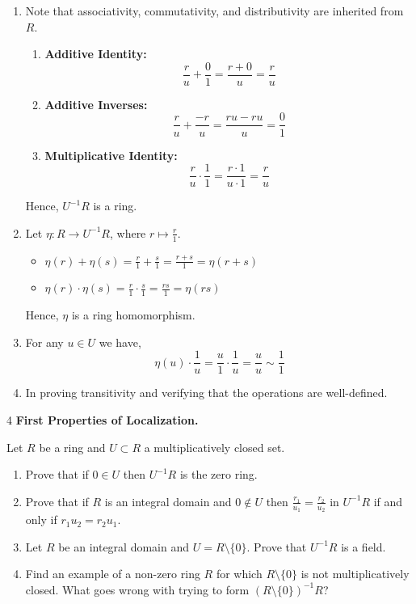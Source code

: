 \documentclass[Notebook.tex]{subfiles}
\begin{document}
\begin{solution}
\begin{enumerate}
\begin{enumerate}
		\end{enumerate}


		\item Note that associativity, commutativity, and distributivity  are inherited from $R$. 
		\begin{enumerate}
			\item \textbf{Additive Identity:} 
			\[\frac{r}{u} + \frac{0}{1} = \frac{r + 0}{u} = \frac{r}{u}\]
			\item \textbf{Additive Inverses:}
			\[\frac{r}{u} + \frac{-r}{u} = \frac{ru - ru}{u} = \frac{0}{1}\]
			\item \textbf{Multiplicative Identity:}
			\[\frac{r}{u} \cdot \frac{1}{1} = \frac{r \cdot 1}{u \cdot 1} = \frac{r}{u}\]
		\end{enumerate}
		Hence, $U^{-1}R$ is a ring. 

		\item Let $\eta: R \to U^{-1}R$, where $r \mapsto \frac{r}{1}$. 
		\begin{itemize}
			\item $\eta(r) + \eta(s) = \frac{r}{1} + \frac{s}{1} = \frac{r + s}{1} = \eta(r+s)$
			\item $\eta(r) \cdot \eta(s) = \frac{r}{1} \cdot \frac{s}{1} = \frac{rs}{1} = \eta(rs)$
		\end{itemize}
		Hence, $\eta$ is a ring homomorphism. 

		\item For any $u \in U$ we have, 
		\[\eta(u) \cdot \frac{1}{u} = \frac{u}{1} \cdot \frac{1}{u} = \frac{u}{u} \sim \frac{1}{1}\]

		\item In proving transitivity and verifying that the operations are well-defined. 
	\end{enumerate}
\end{solution}

\newpage 

\begin{problem}{4}
	\textbf{First Properties of Localization.} 
	
	Let $R$ be a ring and $U \subset R$ a multiplicatively closed set. 
	\begin{enumerate}
		\item Prove that if $0 \in U$ then $U^{-1}R$ is the zero ring. 
		\item Prove that if $R$ is an integral domain and $0\not\in U$ then $\frac{r_1}{u_1}=\frac{r_2}{u_2}$ in $U^{-1}R$ if and only if $r_1u_2=r_2u_1$.
		\item Let $R$ be an integral domain and $U=R\setminus\{0\}$. Prove that $U^{-1}R$ is a field.
		\item Find an example of a non-zero ring $R$ for which $R\setminus\{0\}$ is not multiplicatively closed. What goes wrong with trying to form $(R\setminus\{0\})^{-1}R$?
	\end{enumerate}
\end{problem}
\end{document}
